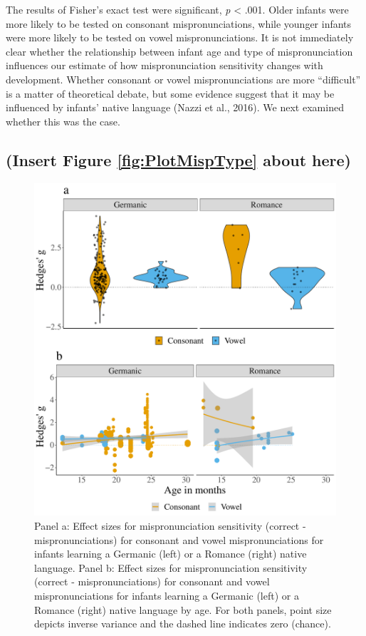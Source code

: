 \documentclass[man]{apa6}
\begin{document}
The results of Fisher's exact test were significant, \emph{p} \textless{} .001. Older infants were more likely to be tested on consonant mispronunciations, while younger infants were more likely to be tested on vowel mispronunciations. It is not immediately clear whether the relationship between infant age and type of mispronunciation influences our estimate of how mispronunciation sensitivity changes with development. Whether consonant or vowel mispronunciations are more \enquote{difficult} is a matter of theoretical debate, but some evidence suggest that it may be influenced by infants' native language (Nazzi et al., 2016). We next examined whether this was the case.

\hypertarget{insert-figure-reffigplotmisptype-about-here}{%
\subsection{(Insert Figure \ref{fig:PlotMispType} about here)}\label{insert-figure-reffigplotmisptype-about-here}}

\begin{figure}
\centering
\includegraphics{VonHolzenBergmann_MPMetaAnalysis_files/figure-latex/PlotCVEffectLang-1.pdf}
\caption{\label{fig:PlotCVEffectLang}Panel a: Effect sizes for mispronunciation sensitivity (correct - mispronunciations) for consonant and vowel mispronunciations for infants learning a Germanic (left) or a Romance (right) native language. Panel b: Effect sizes for mispronunciation sensitivity (correct - mispronunciations) for consonant and vowel mispronunciations for infants learning a Germanic (left) or a Romance (right) native language by age. For both panels, point size depicts inverse variance and the dashed line indicates zero (chance).}
\end{figure}
\end{document}

